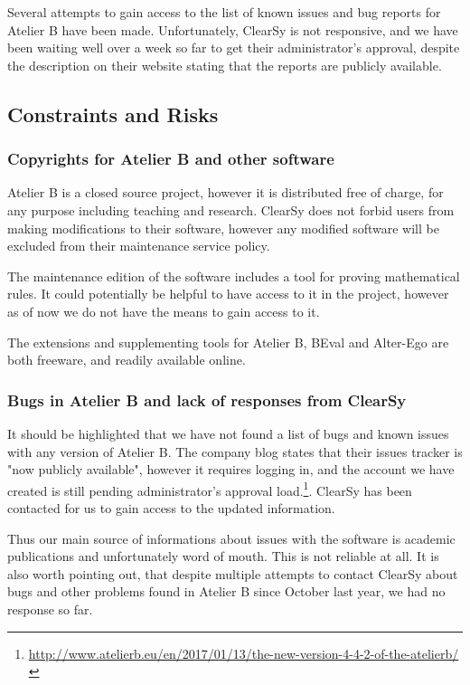 \documentclass[11pt,journal]{IEEEtran}
\begin{document}
	Several attempts to gain access to the list of known issues and bug reports for Atelier B have been made. Unfortunately, ClearSy is not responsive, and we have been waiting well over a week so far to get their administrator's approval, despite the description on their website stating that the reports are publicly available.
	
	\subsection{Constraints and Risks}
	\subsubsection{Copyrights for Atelier B and other software}
	Atelier B is a closed source project, however it is distributed free of charge, for any purpose including teaching and research. ClearSy does not forbid users from making modifications to their software, however any modified software will be excluded from their maintenance service policy.
	
	The maintenance edition of the software includes a tool for proving mathematical rules. It could potentially be helpful to have access to it in the project, however as of now we do not have the means to gain access to it.
	
	The extensions and supplementing tools for Atelier B, BEval and Alter-Ego are both freeware, and readily available online.
	
	\subsubsection{Bugs in Atelier B and lack of responses from ClearSy}
	It should be highlighted that we have not found a list of bugs and known issues with any version of Atelier B. The company blog states that their issues tracker is "now publicly available", however it requires logging in, and the account we have created is still pending administrator's approval load.\footnote{\url{http://www.atelierb.eu/en/2017/01/13/the-new-version-4-4-2-of-the-atelierb/}}. ClearSy has been contacted for us to gain access to the updated information.
	
	Thus our main source of informations about issues with the software is academic publications and unfortunately word of mouth. This is not reliable at all. It is also worth pointing out, that despite multiple attempts to contact ClearSy about bugs and other problems found in Atelier B since October last year, we had no response so far.
	
\end{document}
